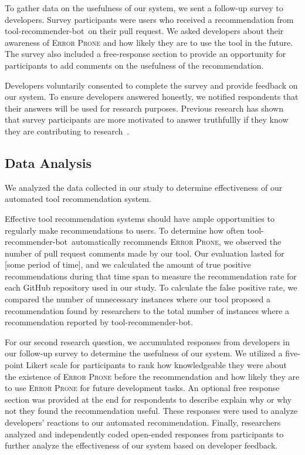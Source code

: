\documentclass[conference]{IEEEtran}
\newcommand{\tool}{tool-recommender-bot}
\newcommand{\pseudosection}[1]{\vspace{2mm} \noindent {\bf #1}}
\begin{document}
\pseudosection{RQ2}

To gather data on the usefulness of our system, we sent a follow-up survey to developers. Survey participants were users who received a recommendation from \tool~on their pull request. We asked developers about their awareness of \textsc{Error Prone} and how likely they are to use the tool in the future. The survey also included a free-response section to provide an opportunity for participants to add comments on the usefulness of the recommendation.

Developers voluntarily consented to complete the survey and provide feedback on our system. To ensure developers answered honestly, we notified respondents that their answers will be used for research purposes. Previous research has shown that survey participants are more motivated to answer truthfullly if they know they are contributing to research~\cite{Krosnick1991Research}.

\subsection{Data Analysis}

We analyzed the data collected in our study to determine effectiveness of our automated tool recommendation system.

\pseudosection{RQ1}

Effective tool recommendation systems should have ample opportunities to regularly make recommendations to users. To determine how often \tool~automatically recommends \textsc{Error Prone}, we observed the number of pull request comments made by our tool. Our evaluation lasted for [some period of time], and we calculated the amount of true positive recommendations during that time span to measure the recommendation rate for each GitHub repository used in our study. To calculate the false positive rate, we compared the number of unnecessary instances where our tool proposed a recommendation found by researchers to the total number of instances where a recommendation reported by \tool.

\pseudosection{RQ2}

For our second research question, we accumulated responses from developers in our follow-up survey to determine the usefulness of our system. We utilized a five-point Likert scale for participants to rank how knowledgeable they were about the existence of \textsc{Error Prone} before the recommendation and how likely they are to use \textsc{Error Prone} for future development tasks. An optional free response section was provided at the end for respondents to describe explain why or why not they found the recommendation useful. These responses were used to analyze developers' reactions to our automated recommendation. Finally, researchers analyzed and independently coded open-ended responses from participants to further analyze the effectiveness of our system based on developer feedback.
\end{document}
